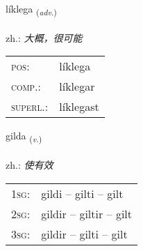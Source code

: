 \documentclass[frontgrid, backgrid]{flacards}\usepackage[]{graphicx}\usepackage[]{xcolor}
\begin{document}
\renewcommand{\flhead}{\vskip5pt \fboxsep=0pt {\small\bfseries\footnotesize Atviksorð | 副词}}
\renewcommand{\fcfoot}{\vskip5pt \fboxsep=0pt \hspace{2pt}{\small\bfseries\footnotesize 1K}}

\renewcommand{\blhead}{\vskip5pt {\small\bfseries\footnotesize Atviksorð | 副词 }}
\renewcommand{\bcfoot}{\vskip5pt \hspace{2pt}{\small\bfseries\footnotesize 1K}}


{líklega \small{\textsubscript{(\textit{adv.})}} \\[1ex] %
\textphonetic{[lihklɛɣa]} \\
zh.: \emph{大概，很可能} \\  [2ex]
\renewcommand*{\arraystretch}{0.8}
\begin{tabular}{ll}
\textsc{pos}: & líklega \\ 
\textsc{comp.}: & líklegar \\ 
\textsc{superl.}: & líklegast \\
\end{tabular}
}

\renewcommand{\flhead}{\vskip5pt \fboxsep=0pt {\small\bfseries\footnotesize Sagnorð | 动词}}
\renewcommand{\fcfoot}{\vskip5pt \fboxsep=0pt \hspace{2pt}{\small\bfseries\footnotesize 1K}}

\renewcommand{\blhead}{\vskip5pt {\small\bfseries\footnotesize Sagnorð | 动词 }}
\renewcommand{\bcfoot}{\vskip5pt \hspace{2pt}{\small\bfseries\footnotesize 1K}}


{gilda \small{\textsubscript{(\textit{v.})}} \\[1ex] %
\textphonetic{[cɪlta]} \\
zh.: \emph{使有效} \\  [2ex]
\renewcommand*{\arraystretch}{0.8}
\begin{tabular}{p{1cm}l}
\textsc{1sg}: & gildi -- gilti -- gilt \\ 
\textsc{2sg}: & gildir -- giltir -- gilt \\ 
\textsc{3sg}: & gildir -- gilti -- gilt \\ 
\end{tabular}
}
\end{document}
